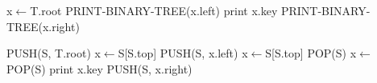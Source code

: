 \documentclass[a4paper, justified]{tufte-handout}
\begin{document}
\begin{solution}
  \begin{algorithm}
    \begin{algorithmic}[5]
      \State x$\gets$T.root
      \State PRINT-BINARY-TREE(x.left)
      \State print x.key
      \State PRINT-BINARY-TREE(x.right)
      \EndIf
      \EndProcedure
    \end{algorithmic}
  \end{algorithm}
\end{solution}

\begin{problem}[TC 10.4-3]
\end{problem}

\begin{solution}
  \begin{algorithm}
    \begin{algorithmic}[6]
      \State PUSH(S, T.root)
      \State x$\gets$S[S.top]
      \State PUSH(S, x.left)
      \State x$\gets$S[S.top]
      \EndWhile
      \State POP(S)
      \State x$\gets$POP(S)
      \State print x.key
      \State PUSH(S, x.right)
      \EndIf
      \EndWhile
      \EndProcedure
    \end{algorithmic}
  \end{algorithm}
\end{solution}

\begin{problem}[TC Problem 10-3]
\end{problem}
\end{document}
